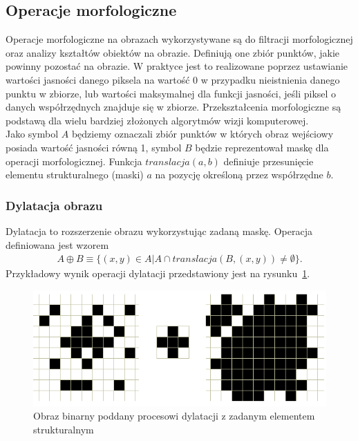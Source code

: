 \subsection{Operacje morfologiczne}
Operacje morfologiczne na obrazach wykorzystywane są do filtracji morfologicznej oraz analizy kształtów obiektów na obrazie. Definiują one zbiór punktów, jakie powinny pozostać na obrazie. W praktyce jest to realizowane poprzez ustawianie wartości jasności danego piksela na wartość 0 w przypadku nieistnienia danego punktu w zbiorze, lub wartości maksymalnej dla funkcji jasności, jeśli piksel o danych współrzędnych znajduje się w zbiorze. Przekształcenia morfologiczne są podstawą dla wielu bardziej złożonych algorytmów wizji komputerowej.\\
Jako symbol $A$ będziemy oznaczali zbiór punktów w których obraz wejściowy posiada wartość jasności równą 1, symbol $B$ będzie reprezentował maskę dla operacji morfologicznej. Funkcja $translacja(a, b)$ definiuje przesunięcie elementu strukturalnego (maski) $a$ na pozycję określoną przez współrzędne $b$.
\subsubsection{Dylatacja obrazu}
Dylatacja to rozszerzenie obrazu wykorzystując zadaną maskę. Operacja definiowana jest wzorem
\begin{gather*}
  A \oplus B \equiv \{ (x, y) \in A | A \cap translacja(B, (x, y)) \neq \emptyset \}.
\end{gather*}
Przykładowy wynik operacji dylatacji przedstawiony jest na rysunku~\ref{fig:dilate}.
\begin{figure}
  \centering
  \includegraphics[width=15cm]{img/dilate}
  \caption{Obraz binarny poddany procesowi dylatacji z zadanym elementem strukturalnym}
  \label{fig:dilate}
\end{figure}
